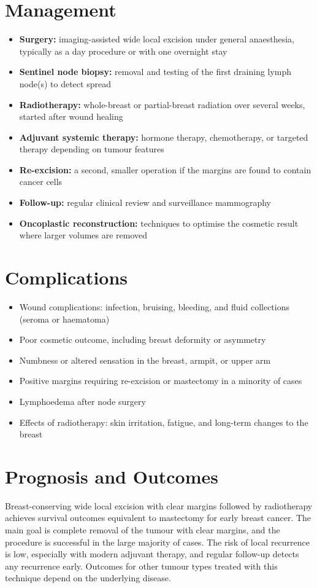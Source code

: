 \section*{Management}
\begin{itemize}
    \item \textbf{Surgery:} imaging-assisted wide local excision under general anaesthesia, typically as a day procedure or with one overnight stay
    \item \textbf{Sentinel node biopsy:} removal and testing of the first draining lymph node(s) to detect spread
    \item \textbf{Radiotherapy:} whole-breast or partial-breast radiation over several weeks, started after wound healing
    \item \textbf{Adjuvant systemic therapy:} hormone therapy, chemotherapy, or targeted therapy depending on tumour features
    \item \textbf{Re-excision:} a second, smaller operation if the margins are found to contain cancer cells
    \item \textbf{Follow-up:} regular clinical review and surveillance mammography
    \item \textbf{Oncoplastic reconstruction:} techniques to optimise the cosmetic result where larger volumes are removed
\end{itemize}

\section*{Complications}
\begin{itemize}
    \item Wound complications: infection, bruising, bleeding, and fluid collections (seroma or haematoma)
    \item Poor cosmetic outcome, including breast deformity or asymmetry
    \item Numbness or altered sensation in the breast, armpit, or upper arm
    \item Positive margins requiring re-excision or mastectomy in a minority of cases
    \item Lymphoedema after node surgery
    \item Effects of radiotherapy: skin irritation, fatigue, and long-term changes to the breast
\end{itemize}

\section*{Prognosis and Outcomes}
Breast-conserving wide local excision with clear margins followed by radiotherapy achieves survival outcomes equivalent to mastectomy for early breast cancer. The main goal is complete removal of the tumour with clear margins, and the procedure is successful in the large majority of cases. The risk of local recurrence is low, especially with modern adjuvant therapy, and regular follow-up detects any recurrence early. Outcomes for other tumour types treated with this technique depend on the underlying disease.

